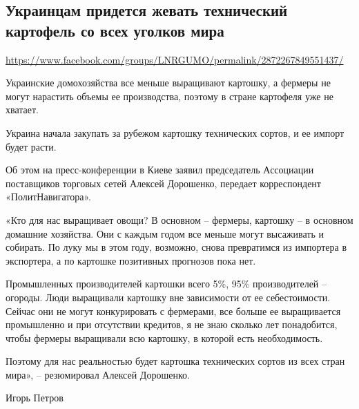  
 

\subsection{Украинцам придется жевать технический картофель со всех уголков мира}
\url{https://www.facebook.com/groups/LNRGUMO/permalink/2872267849551437/}


Украинские домохозяйства все меньше выращивают картошку, а фермеры не могут
нарастить объемы ее производства, поэтому в стране картофеля уже не хватает.

Украина начала закупать за рубежом картошку технических сортов, и ее импорт
будет расти.

Об этом на пресс-конференции в Киеве заявил председатель Ассоциации поставщиков
торговых сетей Алексей Дорошенко, передает корреспондент «ПолитНавигатора».

«Кто для нас выращивает овощи? В основном – фермеры, картошку – в основном
домашние хозяйства. Они с каждым годом все меньше могут высаживать и собирать.
По луку мы в этом году, возможно, снова превратимся из импортера в экспортера,
а по картошке позитивных прогнозов пока нет.

Промышленных производителей картошки всего 5\%, 95\% производителей – огороды.
Люди выращивали картошку вне зависимости от ее себестоимости. Сейчас они не
могут конкурировать с фермерами, все больше ее выращивается промышленно и при
отсутствии кредитов, я не знаю сколько лет понадобится, чтобы фермеры
выращивали всю картошку, в которой есть необходимость.

Поэтому для нас реальностью будет картошка технических сортов из всех стран
мира», – резюмировал Алексей Дорошенко.

Игорь Петров
  
